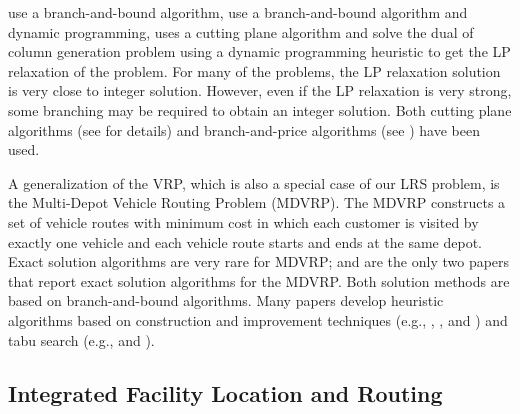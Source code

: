 \citet{Agarwal} use a branch-and-bound algorithm, \citet{Desrochers2} use a 
branch-and-bound algorithm and dynamic programming, \citet{Bixby} uses a cutting plane 
algorithm and \citet{Hadjiconstantinou} solve the dual of column generation problem using a 
dynamic programming heuristic to get the LP relaxation of the problem. For many of the 
problems, the LP relaxation solution is very close to integer solution. However, even if 
the LP relaxation is very strong, some branching may be required to obtain an integer 
solution. Both cutting plane algorithms  (see \citet{Toth} for details) and 
branch-and-price algorithms (see \citet{Desrochers2}) have been used. 


A generalization of the VRP, which is also a special case of our LRS problem, is the Multi-Depot 
Vehicle Routing Problem (MDVRP). The MDVRP constructs a set of vehicle routes with 
minimum cost in which each customer is visited by exactly one vehicle and 
each vehicle route starts and ends at the same depot. Exact solution algorithms are very 
rare for MDVRP; \citet{Laporte6} and \citet{Laporte7} are the only two papers that report 
exact solution algorithms for the MDVRP. Both solution methods are based on branch-and-bound 
algorithms. Many papers develop heuristic algorithms based on construction 
and improvement techniques (e.g., \citet{Tillman}, \citet{Tillman2}, \citet{Gillet} and 
\citet{Chao}) and  tabu search (e.g., \citet{Cordeau} and \citet{Renaud}).


\subsection{Integrated Facility Location and Routing}


